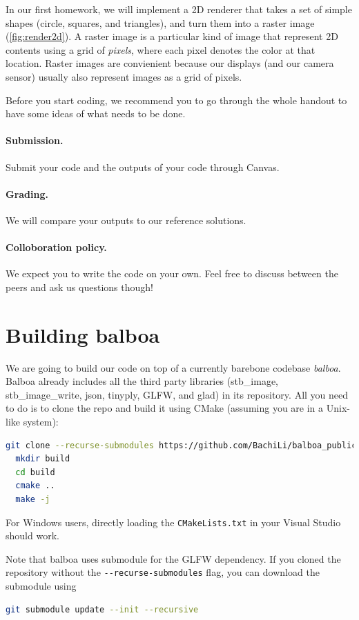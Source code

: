 In our first homework, we will implement a 2D renderer that takes a set of simple shapes (circle, squares, and triangles), and turn them into a raster image (\cref{fig:render2d}). A raster image is a particular kind of image that represent 2D contents using a grid of \emph{pixels}, where each pixel denotes the color at that location. Raster images are convienient because our displays (and our camera sensor) usually also represent images as a grid of pixels.

Before you start coding, we recommend you to go through the whole handout to have some ideas of what needs to be done.

\paragraph{Submission.} Submit your code and the outputs of your code through Canvas.

\paragraph{Grading.} We will compare your outputs to our reference solutions.

\paragraph{Colloboration policy.} We expect you to write the code on your own. Feel free to discuss between the peers and ask us questions though!

\section{Building balboa}

We are going to build our code on top of a currently barebone codebase \emph{balboa}. Balboa already includes all the third party libraries (stb\_image, stb\_image\_write, json, tinyply, GLFW, and glad) in its repository.
All you need to do is to clone the repo and build it using CMake (assuming you are in a Unix-like system):
\begin{lstlisting}[language=bash]
  git clone --recurse-submodules https://github.com/BachiLi/balboa_public
  mkdir build
  cd build
  cmake ..
  make -j
\end{lstlisting}
For Windows users, directly loading the \lstinline{CMakeLists.txt} in your Visual Studio should work. 

Note that balboa uses submodule for the GLFW dependency. If you cloned the repository without the \lstinline{--recurse-submodules} flag, you can download the submodule using
\begin{lstlisting}[language=bash]
git submodule update --init --recursive
\end{lstlisting}

